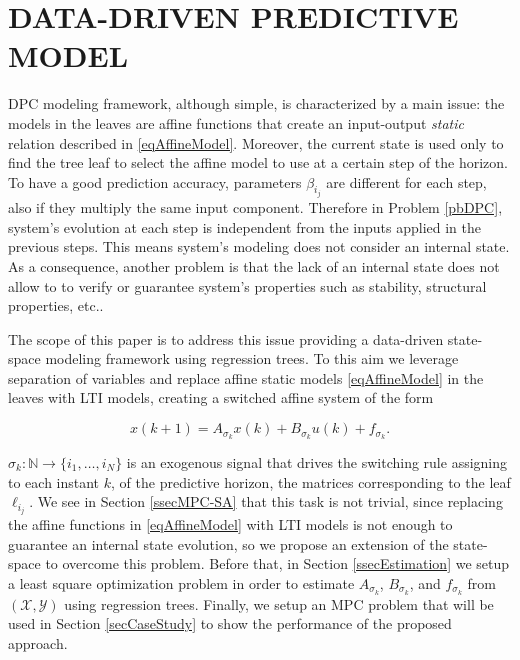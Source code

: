 \documentclass[letterpaper, 10 pt, conference]{ifacconf}  %
\begin{document}

\section{DATA-DRIVEN PREDICTIVE MODEL}\label{secDataDrivenModeling}
DPC modeling framework, although simple, is characterized by a main issue: the models in the leaves are affine functions that create an input-output \emph{static} relation described in \eqref{eqAffineModel}. Moreover, the current state is used only to find the tree leaf to select the affine model to use at a certain step of the horizon. To have a good prediction accuracy, parameters $\beta_{i_j}$ are different for each step, also if they multiply the same input component. Therefore in Problem \ref{pbDPC}, system's evolution at each step is independent from the inputs applied in the previous steps. This means system's modeling does not consider an internal state. As a consequence, another problem is that the lack of an internal state does not allow to to verify or guarantee system's properties such as stability, structural properties, etc..

The scope of this paper is to address this issue providing a data-driven state-space modeling framework using regression trees. To this aim we leverage separation of variables and replace affine static models \eqref{eqAffineModel} in the leaves with LTI models, creating a switched affine system of the form

\begin{equation}\label{eqSwitchedSystemOriginal}
x(k+1) = A_{\sigma_k}x(k) + B_{\sigma_k}u(k) + f_{\sigma_k}.
\end{equation}

\noindent $\sigma_k: \mathbb{N} \rightarrow \{i_1,\ldots,i_N\}$ is an exogenous signal that drives the switching rule assigning to each instant $k$, of the predictive horizon, the matrices corresponding to the leaf $\ell_{i_j}$. We see in Section \ref{ssecMPC-SA} that this task is not trivial, since replacing the affine functions in \eqref{eqAffineModel} with LTI models is not enough to guarantee an internal state evolution, so we propose an extension of the state-space to overcome this problem. Before that, in Section \ref{ssecEstimation} we setup a least square optimization problem in order to estimate $A_{\sigma_k}$, $B_{\sigma_k}$, and $f_{\sigma_k}$ from $(\mathcal{X},\mathcal{Y})$ using regression trees. Finally, we setup an MPC problem that will be used in Section \ref{secCaseStudy} to show the performance of the proposed approach.
\end{document}
